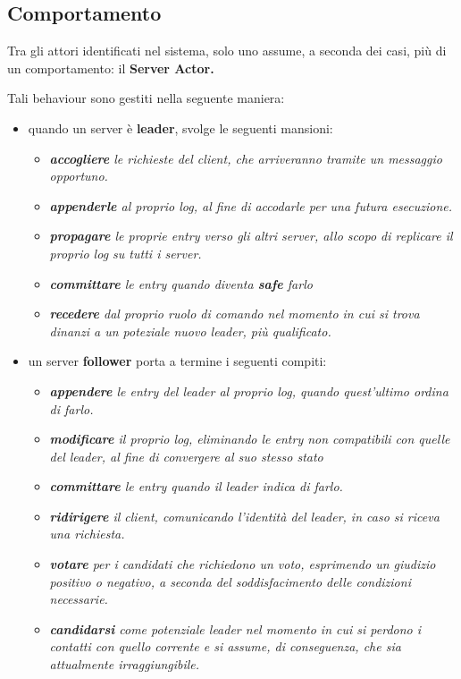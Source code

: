 \subsection{Comportamento}
Tra gli attori identificati nel sistema, solo uno assume, a seconda dei casi, più di un comportamento: il \textbf{Server Actor.}

Tali behaviour sono gestiti nella seguente maniera:
\begin{itemize}
	\item quando un server è \textbf{leader}, svolge le seguenti mansioni:
	\begin{itemize}
		\item \emph{\textbf{accogliere} le richieste del client, che arriveranno tramite un messaggio opportuno.}
		\item \emph{\textbf{appenderle} al proprio log, al fine di accodarle per una futura esecuzione.}
		\item \emph{\textbf{propagare} le proprie entry verso gli altri server, allo scopo di replicare il proprio log su tutti i server.} 
		\item \emph{\textbf{committare} le entry quando diventa \textbf{safe} farlo}  
		\item \emph{\textbf{recedere} dal proprio ruolo di comando nel momento in cui si trova dinanzi a un poteziale nuovo leader, più qualificato.}
	\end{itemize}
	\item un server \textbf{follower} porta a termine i seguenti compiti:
	\begin{itemize}
		\item \emph{\textbf{appendere} le entry del leader al proprio log, quando quest'ultimo ordina di farlo.}
		\item \emph{\textbf{modificare} il proprio log, eliminando le entry non compatibili con quelle del leader, al fine di convergere al suo stesso stato}
		\item \emph{\textbf{committare} le entry quando il leader indica di farlo.}
		\item \emph{\textbf{ridirigere} il client, comunicando l'identità del leader, in caso si riceva una richiesta.}
		\item \emph{\textbf{votare} per i candidati che richiedono un voto, esprimendo un giudizio positivo o negativo, a seconda del soddisfacimento delle condizioni necessarie.}		\item \emph{\textbf{candidarsi} come potenziale leader nel momento in cui si perdono i contatti con quello corrente e si assume, di conseguenza, che sia attualmente irraggiungibile.}
	\end{itemize}


\end{itemize}
